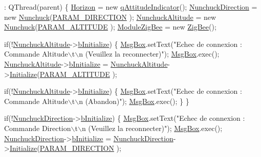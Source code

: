 \begin{DoxyCode}
                            :
    QThread(parent)
\{
    \hyperlink{classQBase_ae4a8b78621695d9a61c311d422824a8d}{Horizon} = \textcolor{keyword}{new} \hyperlink{classqAttitudeIndicator}{qAttitudeIndicator}();
    \hyperlink{classQBase_aa39545ef1795a91bf18db836cde0640d}{NunchuckDirection} = \textcolor{keyword}{new} \hyperlink{classNunchuck}{Nunchuck}(\hyperlink{nunchuck_8h_abeac51046230d277dc5701b7e45dc88e}{PARAM\_DIRECTION}
      );
    \hyperlink{classQBase_a615289f4d92be86986421ec16182ed90}{NunchuckAltitude} = \textcolor{keyword}{new} \hyperlink{classNunchuck}{Nunchuck}(\hyperlink{nunchuck_8h_af420e9167d30b82b0f623019d165944a}{PARAM\_ALTITUDE}
      );
    \hyperlink{classQBase_a466b6191fec7cd0029dfc547a5437752}{ModuleZigBee} = \textcolor{keyword}{new} \hyperlink{classZigBee}{ZigBee}();


    \textcolor{keywordflow}{if}(!\hyperlink{classQBase_a615289f4d92be86986421ec16182ed90}{NunchuckAltitude}->\hyperlink{classNunchuck_a3ecbcb3a01a247605b4f0a37b579581d}{bInitialize}) \{
        \hyperlink{classQBase_aa75e9465559d8633736c52dae36ce1d0}{MsgBox}.setText(\textcolor{stringliteral}{"Echec de connexion : Commande Altitude\(\backslash\)t\(\backslash\)n       
              (Veuillez la reconnecter)"});
        \hyperlink{classQBase_aa75e9465559d8633736c52dae36ce1d0}{MsgBox}.exec();
        \hyperlink{classQBase_a615289f4d92be86986421ec16182ed90}{NunchuckAltitude}->\hyperlink{classNunchuck_a3ecbcb3a01a247605b4f0a37b579581d}{bInitialize} = 
      \hyperlink{classQBase_a615289f4d92be86986421ec16182ed90}{NunchuckAltitude}->\hyperlink{classNunchuck_aabc3105bbe185edb4521506e5da3dc48}{Initialize}(\hyperlink{nunchuck_8h_af420e9167d30b82b0f623019d165944a}{PARAM\_ALTITUDE}
      );

        \textcolor{keywordflow}{if}(!\hyperlink{classQBase_a615289f4d92be86986421ec16182ed90}{NunchuckAltitude}->\hyperlink{classNunchuck_a3ecbcb3a01a247605b4f0a37b579581d}{bInitialize}) \{
            \hyperlink{classQBase_aa75e9465559d8633736c52dae36ce1d0}{MsgBox}.setText(\textcolor{stringliteral}{"Echec de connexion : Commande Altitude\(\backslash\)t\(\backslash\)n   
                  (Abandon)"});
            \hyperlink{classQBase_aa75e9465559d8633736c52dae36ce1d0}{MsgBox}.exec();
        \}
    \}

    \textcolor{keywordflow}{if}(!\hyperlink{classQBase_aa39545ef1795a91bf18db836cde0640d}{NunchuckDirection}->\hyperlink{classNunchuck_a3ecbcb3a01a247605b4f0a37b579581d}{bInitialize}) \{
        \hyperlink{classQBase_aa75e9465559d8633736c52dae36ce1d0}{MsgBox}.setText(\textcolor{stringliteral}{"Echec de connexion : Commande Direction\(\backslash\)t\(\backslash\)n      
               (Veuillez la reconnecter)"});
        \hyperlink{classQBase_aa75e9465559d8633736c52dae36ce1d0}{MsgBox}.exec();
        \hyperlink{classQBase_aa39545ef1795a91bf18db836cde0640d}{NunchuckDirection}->\hyperlink{classNunchuck_a3ecbcb3a01a247605b4f0a37b579581d}{bInitialize} = 
      \hyperlink{classQBase_aa39545ef1795a91bf18db836cde0640d}{NunchuckDirection}->\hyperlink{classNunchuck_aabc3105bbe185edb4521506e5da3dc48}{Initialize}(\hyperlink{nunchuck_8h_abeac51046230d277dc5701b7e45dc88e}{PARAM\_DIRECTION}
      );


\end{DoxyCode}
